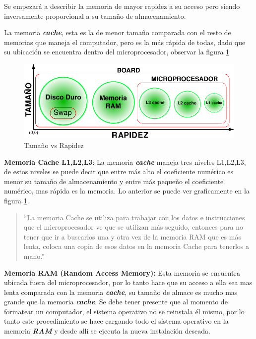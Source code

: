 \documentclass[12pt,letterpaper]{article}
\begin{document}
Se empezará a describir la memoria de mayor rapidez a su acceso pero siendo inversamente proporcional a su tamaño de almacenamiento.


La memoria \textbf{\textit{cache}}, esta es la de menor tamaño comparada con el resto de memorias que maneja el computador, pero es la más rápida de todas, dado que su ubicación se encuentra dentro del microprocesador, observar la figura \ref{F:versus}

\begin{figure}[H]
    \centering
    \includegraphics[angle=0]{image/MemoriaCache.pdf}
    \caption{Tamaño vs Rapidez}
    \label{F:versus}
\end{figure}


\textbf{Memoria Cache L1,L2,L3}: La memoria \textbf{\textit{cache}} maneja tres niveles L1,L2,L3, de estos niveles se puede decir que entre más alto el coeficiente numérico es menor su tamaño de almacenamiento y entre más pequeño el coeficiente numérico, mas rápida es la memoria. Lo anterior se puede ver graficamente en la figura \ref{F:versus}.

\begin{quote}
     ``La memoria Cache se utiliza para trabajar con los datos e instrucciones que el microprocesador ve que se utilizan más seguido, entonces para no tener que ir a buscarlos una y otra vez de la memoria RAM que es más lenta, coloca una copia de esos datos en la memoria Cache para tenerlos a mano.''\cite{GuiaProfesor} 
\end{quote}

\textbf{Memoria RAM (Random Access Memory):} Esta memoria se encuentra ubicada fuera del microprocesador, por lo tanto hace que su acceso a ella sea mas lenta comparada con la memoria \textbf{\textit{cache}}, su tamaño de almace es mucho mas grande que la memoria \textbf{\textit{cache}}. Se debe tener presente que al momento de formatear un computador, el sistema operativo no se reinstala él mismo, por lo tanto este procedimiento se hace cargando todo el sistema operativo en la memoria \textbf{\textit{RAM}} y desde allí se ejecuta la nueva instalación deseada.
\end{document}
